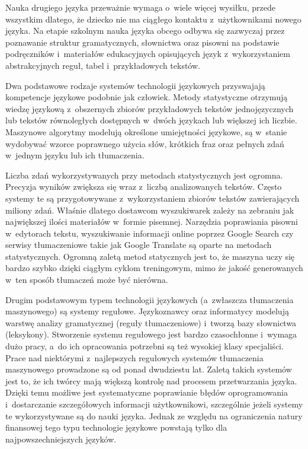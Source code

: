 \begin{multicols}{2}
Nauka drugiego języka przeważnie wymaga o~wiele więcej wysiłku,
przede wszystkim dlatego, że dziecko nie ma ciągłego kontaktu
z~użytkownikami nowego języka. Na etapie szkolnym nauka języka
obcego odbywa się zazwyczaj przez poznawanie struktur gramatycznych,
słownictwa oraz pisowni na podstawie podręczników i~materiałów
edukacyjnych opisujących język z~wykorzystaniem abstrakcyjnych
reguł, tabel i~przykładowych tekstów. 


Dwa podstawowe rodzaje systemów technologii językowych przyswajają
kompetencje językowe podobnie jak człowiek. Metody statystyczne
otrzymują wiedzę językową z~obszernych zbiorów przykładowych
tekstów jednojęzycznych lub tekstów równoległych dostępnych
w~dwóch językach lub większej ich liczbie. Maszynowe algorytmy
modelują określone umiejętności językowe, są w~stanie wydobywać
wzorce poprawnego użycia słów, krótkich fraz oraz pełnych zdań
w~jednym języku lub ich tłumaczenia. 

Liczba zdań wykorzystywanych przy metodach statystycznych jest
ogromna. Precyzja wyników zwiększa się wraz z~liczbą analizowanych
tekstów. Często systemy te są przygotowywane z~wykorzystaniem
zbiorów tekstów zawierających miliony zdań. Właśnie dlatego
dostawcom wyszukiwarek zależy na zebraniu jak największej ilości
materiałów w~formie pisemnej. Narzędzia poprawiania pisowni
w~edytorach tekstu, wyszukiwanie informacji online poprzez Google
Search czy serwisy tłumaczeniowe takie jak Google Translate są
oparte na metodach statystycznych. Ogromną zaletą metod statycznych
jest to, że maszyna uczy się bardzo szybko dzięki ciągłym cyklom
treningowym, mimo że jakość generowanych w~ten sposób tłumaczeń
może być nierówna. 

Drugim podstawowym typem technologii językowych (a~zwłaszcza
tłumaczenia maszynowego) są systemy regułowe. Językoznawcy oraz
informatycy modelują warstwę analizy gramatycznej (reguły
tłumaczeniowe) i~tworzą bazy słownictwa (leksykony). Stworzenie
systemu regułowego jest bardzo czasochłonne i~wymaga dużo pracy,
a~do ich opracowania potrzebni są też wysokiej klasy specjaliści.
Prace nad niektórymi z~najlepszych regułowych systemów tłumaczenia
maszynowego prowadzone są od ponad dwudziestu lat. Zaletą takich
systemów jest to, że ich twórcy mają większą kontrolę nad
procesem przetwarzania języka. Dzięki temu możliwe jest
systematyczne poprawianie błędów oprogramowania i~dostarczanie
szczegółowych informacji użytkownikowi, szczególnie jeżeli
systemy te wykorzystywane są do nauki języka. Jednak ze względu na
ograniczenia natury finansowej tego typu technologie językowe
powstają tylko dla najpowszechniejszych języków. 


\end{multicols}
